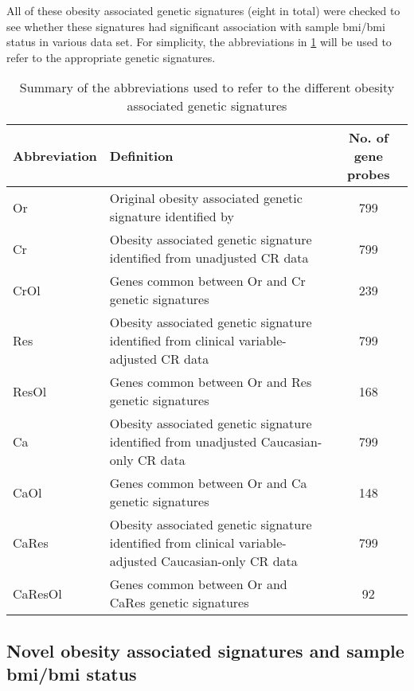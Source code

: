All of these obesity associated genetic signatures (eight in total) were checked to see whether these signatures had significant association with sample \gls{bmi}/\gls{bmi} status in various data set.
For simplicity, the abbreviations in \cref{tab:mg_abbrev} will be used to refer to the appropriate genetic signatures.

\begin{table}[htpb]
	\centering
	\caption{Summary of the abbreviations used to refer to the different obesity associated genetic signatures}
	\label{tab:mg_abbrev}
	\begin{tabular}{lp{}c}
		\hline
		\hline
		Abbreviation & Definition & No. of gene probes\\
		\hline
		\rule{0pt}{2.25ex}Or      & Original obesity associated genetic signature identified by \citet{Creighton2012}                       & 799\\
		\rule{0pt}{2.25ex}Cr      & Obesity associated genetic signature identified from unadjusted CR data                                & 799 \\
		\rule{0pt}{2.25ex}CrOl    & Genes common between Or and Cr genetic signatures                                                       & 239\\
		\rule{0pt}{2.25ex}Res     & Obesity associated genetic signature identified from clinical variable-adjusted CR data                & 799\\
		\rule{0pt}{2.25ex}ResOl   & Genes common between Or and Res genetic signatures                                                      & 168\\
		\rule{0pt}{2.25ex}Ca      & Obesity associated genetic signature identified from unadjusted Caucasian-only CR data                 & 799\\
		\rule{0pt}{2.25ex}CaOl    & Genes common between Or and Ca genetic signatures                                                       & 148\\
		\rule{0pt}{2.25ex}CaRes   & Obesity associated genetic signature identified from clinical variable-adjusted Caucasian-only CR data & 799\\
		\rule{0pt}{2.25ex}CaResOl & Genes common between Or and CaRes genetic signatures                                                    & 92\\
		\hline
		\hline
	\end{tabular}
\end{table}

\subsection{Novel obesity associated signatures and sample \gls{bmi}/\gls{bmi} status}
\label{sub:_novel_obesity_associated_signatures_and_sample_bmi}

